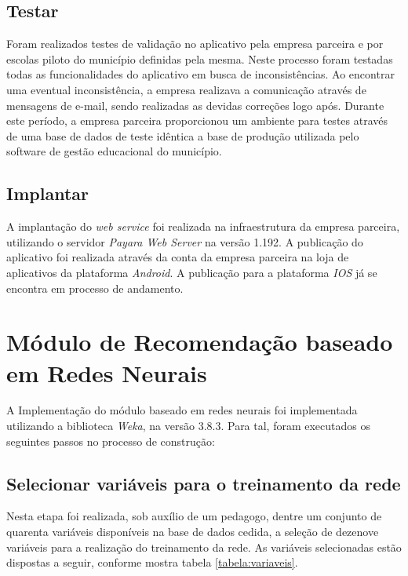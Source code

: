 \subsection{Testar}

Foram realizados testes de validação \cite{pressman2016engenharia} no aplicativo pela empresa parceira e por escolas piloto do município definidas pela mesma. Neste processo foram testadas todas as funcionalidades do aplicativo em busca de inconsistências. Ao encontrar uma eventual inconsistência, a empresa realizava a comunicação através de mensagens de e-mail, sendo realizadas as devidas correções logo após. Durante este período, a empresa parceira proporcionou um ambiente para testes através de uma base de dados de teste idêntica a base de produção utilizada pelo software de gestão educacional do município.

\subsection{Implantar}

A implantação do \textit{web service} foi realizada na infraestrutura da empresa parceira, utilizando o servidor \textit{Payara Web Server} na versão 1.192. A publicação do aplicativo foi realizada através da conta da empresa parceira na loja de aplicativos da plataforma \textit{Android}. A publicação para a plataforma \textit{IOS} já se encontra em processo de andamento.

\section{Módulo de Recomendação baseado em Redes Neurais}

A Implementação do módulo baseado em redes neurais foi implementada utilizando a biblioteca \textit{Weka}, na versão 3.8.3. Para tal, foram executados os seguintes passos no processo de construção:

\subsection{Selecionar variáveis para o treinamento da rede}

Nesta etapa foi realizada, sob auxílio de um pedagogo, dentre um conjunto de quarenta variáveis disponíveis na base de dados cedida, a seleção de dezenove variáveis para a realização do treinamento da rede. As variáveis selecionadas estão dispostas a seguir, conforme mostra tabela \ref{tabela:variaveis}.


